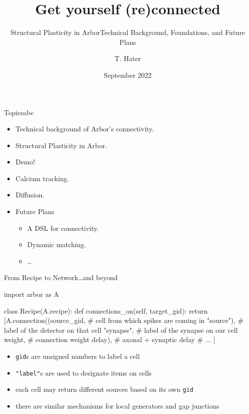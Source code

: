 \documentclass{beamer}
\author{T. Hater}
\institute{Forschungszentrum J\"ulich}
\title{Get yourself (re)connected}
\subtitle{Structural Plasticity in Arbor\newline{}\small{Technical Background, Foundations, and Future Plans}}
\date{September 2022}
\begin{document}
\maketitle

\begin{frame}{Topics}{abc}
  \begin{itemize}
    \item Technical background of Arbor's connectivity.
    \item Structural Plasticity in Arbor.
    \item Demo!
    \item Calcium tracking.
    \item Diffusion.
    \item Future Plans
          \begin{itemize}
            \item A DSL for connectivity.
            \item Dynamic matching.
            \item \dots
          \end{itemize}
  \end{itemize}
\end{frame}

\begin{frame}[fragile]{From Recipe to Network}{\dots and beyond}
\begin{codePythonblock}
import arbor as A

class Recipe(A.recipe):
    def connections_on(self, target_gid):
        return [A.connection((source_gid,   # cell from which spikes are coming in
                              "source"),    # label of the detector on that cell
                             "synapse",     # label of the synapse on our cell
                             weight,        # connection weight
                             delay),        # axonal + synaptic delay
                # ...
                ]
\end{codePythonblock}
\begin{itemize}
  \item \texttt{gid}s are unsigned numbers to label a cell
  \item \texttt{"label"}s are used to designate items on cells
  \item each cell may return different sources based on its own \texttt{gid}
  \item there are similar mechanisms for local generators and gap junctions
\end{itemize}
\end{frame}
\end{document}
